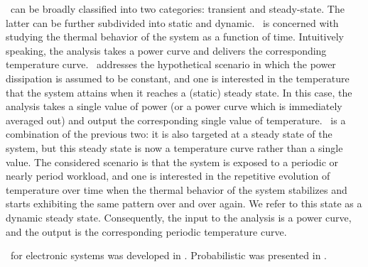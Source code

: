 \Ta\ can be broadly classified into two categories: transient and steady-state.
The latter can be further subdivided into static and dynamic.
\Tta\ is concerned with studying the thermal behavior of the system as a function of time.
Intuitively speaking, the analysis takes a power curve and delivers the corresponding temperature curve.
\Sssta\ addresses the hypothetical scenario in which the power dissipation is assumed to be constant, and one is interested in the temperature that the system attains when it reaches a (static) steady state.
In this case, the analysis takes a single value of power (or a power curve which is immediately averaged out) and output the corresponding single value of temperature.
\Dssta\ is a combination of the previous two: it is also targeted at a steady state of the system, but this steady state is now a temperature curve rather than a single value.
The considered scenario is that the system is exposed to a periodic or nearly period workload, and one is interested in the repetitive evolution of temperature over time when the thermal behavior of the system stabilizes and starts exhibiting the same pattern over and over again.
We refer to this state as a dynamic steady state.
Consequently, the input to the analysis is a power curve, and the output is the corresponding periodic temperature curve.

\Dssta\ for electronic systems was developed in \cite{ukhov2012}.
Probabilistic \tta was presented in \cite{ukhov2014}.
